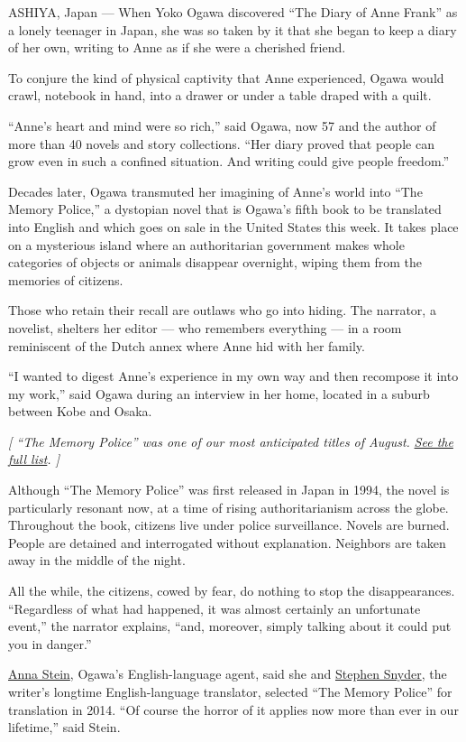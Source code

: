 ASHIYA, Japan --- When Yoko Ogawa discovered ``The Diary of Anne Frank''
as a lonely teenager in Japan, she was so taken by it that she began to
keep a diary of her own, writing to Anne as if she were a cherished
friend.

To conjure the kind of physical captivity that Anne experienced, Ogawa
would crawl, notebook in hand, into a drawer or under a table draped
with a quilt.

``Anne's heart and mind were so rich,'' said Ogawa, now 57 and the
author of more than 40 novels and story collections. ``Her diary proved
that people can grow even in such a confined situation. And writing
could give people freedom.''

Decades later, Ogawa transmuted her imagining of Anne's world into ``The
Memory Police,'' a dystopian novel that is Ogawa's fifth book to be
translated into English and which goes on sale in the United States this
week. It takes place on a mysterious island where an authoritarian
government makes whole categories of objects or animals disappear
overnight, wiping them from the memories of citizens.

Those who retain their recall are outlaws who go into hiding. The
narrator, a novelist, shelters her editor --- who remembers everything
--- in a room reminiscent of the Dutch annex where Anne hid with her
family.

``I wanted to digest Anne's experience in my own way and then recompose
it into my work,'' said Ogawa during an interview in her home, located
in a suburb between Kobe and Osaka.

\emph{{[} ``The Memory Police'' was one of our most anticipated titles
of August.}
\emph{\href{https://www.nytimes3xbfgragh.onion/2019/07/31/books/new-august-books.html?module=inline}{See
the full list}. {]}}

Although ``The Memory Police'' was first released in Japan in 1994, the
novel is particularly resonant now, at a time of rising authoritarianism
across the globe. Throughout the book, citizens live under police
surveillance. Novels are burned. People are detained and interrogated
without explanation. Neighbors are taken away in the middle of the
night.

All the while, the citizens, cowed by fear, do nothing to stop the
disappearances. ``Regardless of what had happened, it was almost
certainly an unfortunate event,'' the narrator explains, ``and,
moreover, simply talking about it could put you in danger.''

\href{https://www.nytimes3xbfgragh.onion/2007/10/15/arts/15fair.html?ref=arts}{Anna
Stein}, Ogawa's English-language agent, said she and
\href{http://www.middlebury.edu/ls/contact/node/52591}{Stephen Snyder},
the writer's longtime English-language translator, selected ``The Memory
Police'' for translation in 2014. ``Of course the horror of it applies
now more than ever in our lifetime,'' said Stein.

